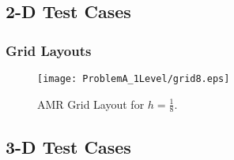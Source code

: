 \newpage
\subsection{2-D Test Cases}
\label{Results2D}

\subsubsection{Grid Layouts}
\begin{figure}[htbp]
\begin{center}
\texttt{[image: ProblemA\_1Level/grid8.eps]}
\end{center}
\caption{AMR Grid Layout for $h = \frac18$.} \label{grid8}
\end{figure}

\newpage


\newpage
\subsection{3-D Test Cases}
\label{Results3D}

\newpage


\newpage


\newpage


\newpage


\newpage


\newpage


\newpage


\newpage


\newpage


